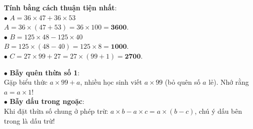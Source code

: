 \documentclass[14pt,a4paper,oneside]{extbook}
\begin{document}
\noindent
\begin{minipage}[t]{0.53\textwidth}
  \begin{tcolorbox}[
    enhanced,
    title={\footnotesize\bfseries\color{white}\faCheckCircle\ Ví dụ thực hành chuẩn mực},
    colback=green!2!white,
    colframe=green!60!black,
    arc=2.5mm, boxrule=0.8pt, top=1.8mm, bottom=1.8mm, left=2.2mm, right=2.2mm
  ]
    \footnotesize
    \textbf{Tính bằng cách thuận tiện nhất}:\\
    $\bullet$ $A = 36 \times 47 + 36 \times 53$\\
    $A = 36 \times (47 + 53) = 36 \times 100 = \mathbf{3600}$.\\[1mm]
    $\bullet$ $B = 125 \times 48 - 125 \times 40$\\
    $B = 125 \times (48 - 40) = 125 \times 8 = \mathbf{1000}$.\\[1mm]
    $\bullet$ $C = 27 \times 99 + 27 = 27 \times (99 + 1) = \mathbf{2700}$.
  \end{tcolorbox}
\end{minipage}%
\hfill
\begin{minipage}[t]{0.45\textwidth}
  \begin{tcolorbox}[
    enhanced,
    title={\footnotesize\bfseries\color{white}\faExclamationTriangle\ Mẹo tránh bẫy trắc nghiệm},
    colback=red!2!white,
    colframe=red!70!black,
    arc=2.5mm, boxrule=0.8pt, top=1.8mm, bottom=1.8mm, left=2.2mm, right=2.2mm
  ]
    \footnotesize
    $\bullet$ \textbf{Bẫy quên thừa số 1}:\\
    Gặp biểu thức $a \times 99 + a$, nhiều học sinh viết $a \times 99$ (bỏ quên số $a$ lẻ). Nhớ rằng $a = a \times 1$!\\
    $\bullet$ \textbf{Bẫy dấu trong ngoặc}:\\
    Khi đặt thừa số chung ở phép trừ: $a \times b - a \times c = a \times (b - c)$, chú ý dấu bên trong là dấu trừ!
  \end{tcolorbox}
\end{minipage}
\end{document}
